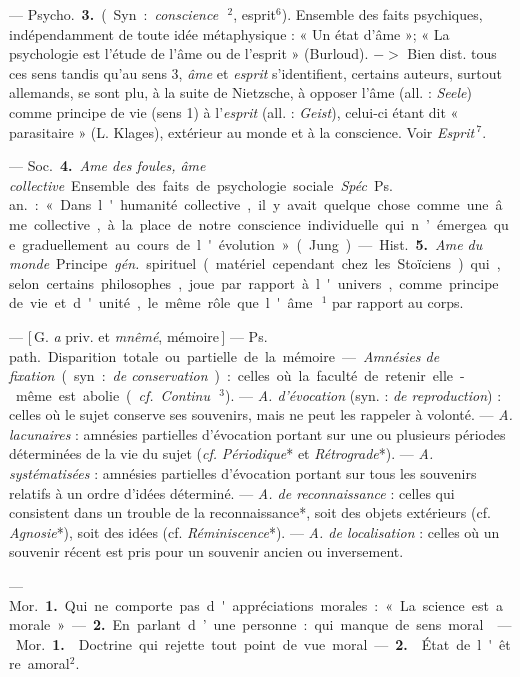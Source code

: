 \begin{itemize}[leftmargin=1cm, label=, itemsep=1pt]
{— \si{Psycho.} {\bf 3.} (Syn. : {\it conscience}\,$^2$,
esprit$^6$). Ensemble des faits psychiques, indépendamment de toute
idée métaphysique : « Un état
d'âme »; « La psychologie est l'étude
de l'âme ou de l'esprit » (Burloud).
$->$ Bien dist. tous ces sens
tandis qu'au sens 3, {\it âme} et {\it esprit}
s'identifient, certains auteurs, surtout allemands, se sont plu, à la suite
de Nietzsche, à opposer l’âme (all. :
{\it Seele}) comme principe de vie (sens 1)
à l'{\it esprit} (all. : {\it Geist}), celui-ci étant
dit « parasitaire » (L. Klages),
extérieur au monde et à la conscience. Voir {\it Esprit}\,$^7$.

— \si{Soc.} {\bf 4.} {\it Ame des foules, âme
collective}. Ensemble des faits de
psychologie sociale. {\it Spéc}. \si{Ps. an.} :
« Dans l'humanité collective, il y
avait quelque chose comme une âme
collective, à la place de notre conscience individuelle qui n’émergea
que graduellement au cours de
l'évolution » (Jung).

— \si{Hist.} {\bf 5.} {\it Ame du monde}. Principe  {\it gén.} spirituel (matériel
cependant chez les Stoïciens) qui, selon
certains philosophes, joue par rapport à l'univers, comme principe
de vie et d'unité, le même rôle que
l'âme\,$^1$ par rapport au corps.

 — [\,G. {\it a} priv. et {\it mnêmé}, mémoire\,] — \si{Ps. path.} Disparition
totale ou partielle de la mémoire.
— {\it Amnésies de fixation} (syn. : {\it de
conservation}) : celles où la faculté de
retenir elle-même est abolie ({\it cf.}  {\it Continu}\,$^3$).
— {\it A. d'évocation} (syn. : {\it de
reproduction}) : celles où le sujet conserve ses souvenirs, mais ne peut les
rappeler à volonté. — {\it A. lacunaires} :
amnésies partielles d’évocation portant sur une ou plusieurs périodes
déterminées de la vie du sujet ({\it cf.} 
{\it Périodique}* et {\it Rétrograde}*). — {\it A.
systématisées} : amnésies partielles
d'évocation portant sur tous les souvenirs relatifs à un ordre d'idées
déterminé. — {\it A. de reconnaissance} :
celles qui consistent dans un trouble
de la reconnaissance*, soit des objets
extérieurs (cf. {\it Agnosie}*), soit des
idées (cf. {\it Réminiscence}*). — {\it A. de
localisation} : celles où un souvenir
récent est pris pour un souvenir
ancien ou inversement.

 — \si{Mor.} {\bf 1.} Qui ne comporte
pas d'appréciations morales : « La
science est amorale ». — {\bf 2.} En parlant d’une personne : qui manque
de sens moral.

 — \si{Mor.} {\bf 1.}  Doctrine qui
rejette tout point de vue moral. —
 {\bf 2.}  État de l'être amoral$^2$.

}
\end{itemize}
